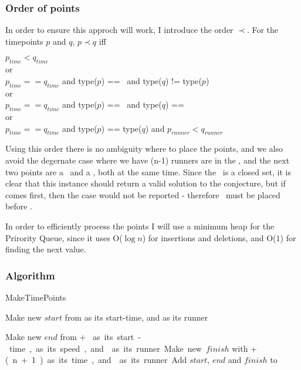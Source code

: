 \subsubsection{Order of points}
In order to ensure this approch will work, I introduce the order $\prec$. For the timepoints $p$ and $q$, $p \prec q$ iff \\

\begin{center}
$p_{time} < q_{time}$\\
or \\
$p_{time} == q_{time}$ and type($p$) == \comFin\, and type($q$) != type($p$)\\
or \\
$p_{time} == q_{time}$ and type($p$) == \comStart\, and type($q$) == \comEnd \\
or \\
$p_{time} == q_{time}$ and type($p$) == type($q$) and $p_{runner} < q_{runner}$
\end{center}

Using this order there is no ambiguity where to place the points, and we also avoid the degernate case where we have (n-1) runners are in the \zone, and the next two points are a \comEnd\, and a \comStart, both at the same time. Since the \zone\, is a closed set, it is clear that this instance should return a valid solution to the conjecture, but if \comEnd\, comes first, then the case would not be reported - therefore \comStart\, must be placed before \comEnd.

In order to efficiently process the points I will use a minimum heap for the Prirority Queue, since it uses O($\log n$) for insertions and deletions, and O($1$) for finding the next value.

\subsubsection{Algorithm}
\begin{algorithm}[H]
\caption{MakeTimePoints}
\highlights
{}
 
Make new \startT $start$ from \start as its start-time, and \run as its runner
  
Make new \eT $end$ from \start + \unit * \n as its start-time, \unit as its speed, and \run as its runner
  
Make new \finish $finish$ with \start + \unit * (n+1) as its time, and \run as its runner
  
Add $start$, $end$ and $finish$ to \li

\return \li
\end{algorithm}

